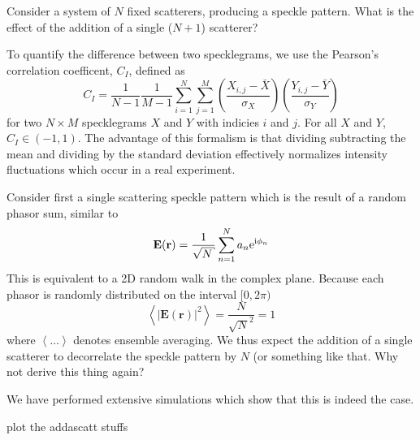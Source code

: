 Consider a system of $N$ fixed scatterers, producing a speckle pattern.
What is the effect of the addition of a single ($N+1$) scatterer?

To quantify the difference between two specklegrams, we use the Pearson's
correlation coefficent, $C_I$, defined as 
\begin{equation}
C_I = \frac{1}{N-1} \frac{1}{M-1} 
\sum_{i=1}^N \sum_{j=1}^M 
\left(\frac{X_{i,j} - \bar{X}}{\sigma_X}\right)
\left(\frac{Y_{i,j} - \bar{Y}}{\sigma_Y}\right)
\end{equation}
for two $N \times M$ specklegrams $X$ and $Y$ with indicies $i$ and $j$.
For all $X$ and $Y$, $C_I \in (-1,1)$.
The advantage of this formalism is that dividing subtracting the mean and
dividing by the standard deviation effectively normalizes intensity
fluctuations which occur in a real experiment.

Consider first a single scattering speckle pattern which is the result of a
random phasor sum, similar to 
\begin{equation}
\mathbf{E}(\mathbf{r}) = \frac{1}{\sqrt{N}} \sum_{n=1}^{N} a_n \me^{\mi \phi_n}
\end{equation}
This is equivalent to a 2D random walk in the complex plane.  Because each
phasor is randomly distributed on the interval $[0,2\pi)$
\begin{equation}
\left<|\mathbf{E}(\mathbf{r})|^2\right> = \frac{N}{\sqrt{N}^2} = 1
\end{equation}
where $\left<\ldots\right>$ denotes ensemble averaging.  We thus expect the
addition of a single scatterer to decorrelate the speckle pattern by $N$
(or something like that.  Why not derive this thing again?

We have performed extensive simulations which show that this is indeed the
case.

plot the addascatt stuffs
